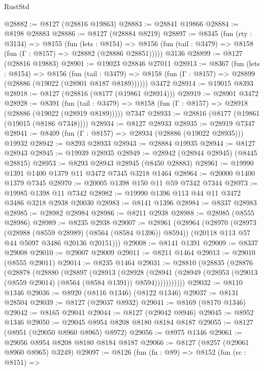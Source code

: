 \begin{lexlean}{RustStd}
\begin{coremodule}
@28882 := @8127 (@28816 @19863)
@28883 := @28841 @19866
@28884 := @8198 @28883
@28886 := @8127 (@28884 @8219)
@28897 := @8345
    (fun (rty : @3134) =>
    @8155
      (fun (lets : @8154) =>
      @8156 (fun (tail : @3479) => @8158 (fun (Γ : @8157) => @28882 (@28886 @28851)))))
    @3136
@28899 := @8127 (@28816 @19883)
@28901 := @19023 @28846 @27011
@28913 := @8367
    (fun (lets : @8154) =>
    @8156
      (fun (tail : @3479) =>
      @8158 (fun (Γ : @8157) => @28899 (@28886 (@19022 (@28901 @8187 @8189))))))
    @3472
@28914 := @19015 @8393
@28918 := @8127 (@28816 (@8177 (@19861 @28914)))
@28919 := @28901 @3472
@28928 := @8391
    (fun (tail : @3479) => @8158 (fun (Γ : @8157) => @28918 (@28886 (@19022 (@28919 @8189)))))
    @7347
@28933 := @28816 (@8177 (@19861 (@19015 (@8186 @7348))))
@28934 := @8127 @28933
@28935 := @28919 @7347
@28941 := @8409 (fun (Γ : @8157) => @28934 (@28886 (@19022 @28935))) @19932
@28942 := @8293 @28933
@28943 := @28884 @19935
@28944 := @8127 @28943
@28945 := @19939 @28935
@28949 := @28942 (@28944 @28945) (@8445 @28815)
@28953 := @8293 @28943 @28945 (@8450 @28883)
@28961 := @19990 @1391 @1400 @1379 @11 @3472 @7345 @3218 @1464
@28964 := @20000 @1400 @1379 @7345
@28970 := @20005 @1398 @150 @11 @59 @7342 @7344
@28973 := @19985 @1398 @11 @7342
@28982 := @19990 @1396 @113 @44 @11 @3472 @3486 @3218 @2938 @20030
@28983 := @8141 @1396
@28984 := @8337 @28983
@28985 := @28982 @28984
@28986 := @8211 @2938
@28988 := @28985 (@8555 @28986)
@28989 := @8235 @2938
@29007 := @28961
    (@28964
      (@28970
        (@28973 (@28988 (@8559 @28989) (@8564 (@8584 @1396)) @8594))
        (@20118 @113 @57 @44 @5097 @3486 @20136 @20151)))
@29008 := @8141 @1391
@29009 := @8337 @29008
@29010 := @29007 @29009
@29011 := @8211 @1464
@29013 := @29010 (@8555 @29011)
@29014 := @8235 @1464
@29031 := @28810
    (@28835
      (@28876
        (@28878
          (@28880
            (@28897
              (@28913
                (@28928
                  (@28941
                    (@28949 (@28953 (@29013 (@8559 @29014) (@8564 (@8584 @1391)) @8594)))))))))))
@29032 := @8110 @1346
@29036 := @8920 (@8116 @1346) (@8122 @1346)
@29037 := @8131 @28504
@29039 := @8127 (@29037 @8932)
@29041 := @8169 (@8170 @1346)
@29042 := @8165 @29041
@29044 := @8127 (@29042 @8946)
@29045 := @8952 @1346
@29050 := @29045 @8954 @8208 @8180 @8184 @8187
@29055 := @8127 (@8951 (@29050 @8960 @8965) @8972)
@29056 := @8975 @1346
@29061 := @29056 @8954 @8208 @8180 @8184 @8187
@29066 := @8127 (@8257 (@29061 @8960 @8965) @3249)
@29097 := @8126
    (fun (fn : @89) =>
    @8152
      (fun (rc : @8151) =>

\end{coremodule}
\end{lexlean}
